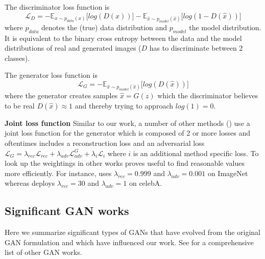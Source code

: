 \documentclass[a4paper,12pt]{report}
\begin{document}
The discriminator loss function is
\begin{equation} \label{eq:d_loss}
    \mathcal{L}_{D} = -\mathbb{E}_{x\sim p_{data} (x)}\big[log(D(x))\big] - \mathbb{E}_{\hat{x}\sim p_{model} (\hat{x})}\big[log(1 - D(\hat{x}))\big]
\end{equation}
where $p_{data}$ denotes the (true) data distribution and $p_{model}$ the model distribution. It is equivalent to the binary cross entropy between the data and the model distributions of real and generated images ($D$ has to discriminate between 2 classes).

The generator loss function is
\begin{equation} \label{eq:g_loss}
    \mathcal{L}_{G} = -\mathbb{E}_{\hat{x}\sim p_{model} (\hat{x})}\big[log(D(\hat{x}))\big]
\end{equation}
where the generator creates samples $\hat{x} = G(z)$ which the discriminator believes to be real $D(\hat{x}) \approx 1$ and thereby trying to approach $log(1) = 0$.

\par \textbf{Joint loss function}
Similar to our work, a number of other methods (\cite{1511.05440, DisentFacOfVarByMixTh, 1604.07379}) use a joint loss function for the generator which is composed of 2 or more losses and oftentimes includes a reconstruction loss and an adversarial loss $\mathcal{L}_G = \lambda_{rec}\mathcal{L}_{rec} + \lambda_{adv}\mathcal{L}^G_{adv} + \lambda_{i}\mathcal{L}_{i}$ where $i$ is an additional method specific loss. To look up the weightings in other works proves useful to find reasonable values more efficiently. For instance, \cite{1604.07379} uses $\lambda_{rec} = 0.999$ and $\lambda_{adv} = 0.001$ on ImageNet whereas \cite{DisentFacOfVarByMixTh} deploys $\lambda_{rec} = 30$ and $\lambda_{adv} = 1$ on celebA.

\subsection{Significant GAN works}
Here we summarize significant types of GANs that have evolved from the original GAN formulation and which have influenced our work. See \cite{theGanZoo} for a comprehensive list of other GAN works.
\end{document}
